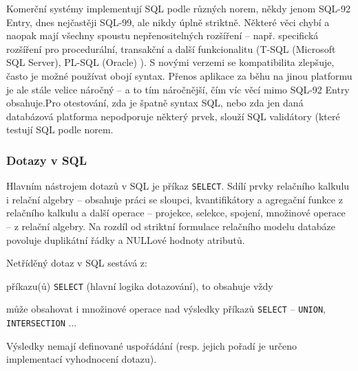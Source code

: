 Komerční systémy implementují SQL podle různých norem, někdy jenom SQL-92 Entry, dnes nejčastěji SQL-99, ale nikdy úplně striktně. Některé věci chybí a naopak mají všechny spoustu nepřenositelných rozšíření -- např. specifická rozšíření pro procedurální, transakční a další funkcionalitu (T-SQL (Microsoft SQL Server), PL-SQL (Oracle) ). S novými verzemi se kompatibilita zlepšuje, často je možné používat obojí syntax. Přenos aplikace za běhu na jinou platformu je ale stále velice náročný -- a to tím náročnější, čím víc věcí mimo SQL-92 Entry obsahuje.Pro otestování, zda je špatně syntax SQL, nebo zda jen daná databázová platforma nepodporuje některý prvek, slouží SQL validátory (které testují SQL podle norem.


\subsubsection*{Dotazy v SQL}

Hlavním nástrojem dotazů v SQL je příkaz \texttt{SELECT}. Sdílí prvky relačního kalkulu i relační algebry -- obsahuje práci se sloupci, kvantifikátory a agregační funkce z relačního kalkulu a další operace -- projekce, selekce, spojení, množinové operace -- z relační algebry. Na rozdíl od striktní formulace relačního modelu databáze povoluje duplikátní řádky a NULLové hodnoty atributů.

Netříděný dotaz v SQL sestává z:
\begin{pitemize}
    \item příkazu(ů) \texttt{SELECT} (hlavní logika dotazování), to obsahuje vždy
    \item může obsahovat i množinové operace nad výsledky příkazů \texttt{SELECT} -- \texttt{UNION}, \texttt{INTERSECTION} ...
\end{pitemize}
Výsledky nemají definované uspořádání (resp. jejich pořadí je určeno implementací vyhodnocení dotazu).

